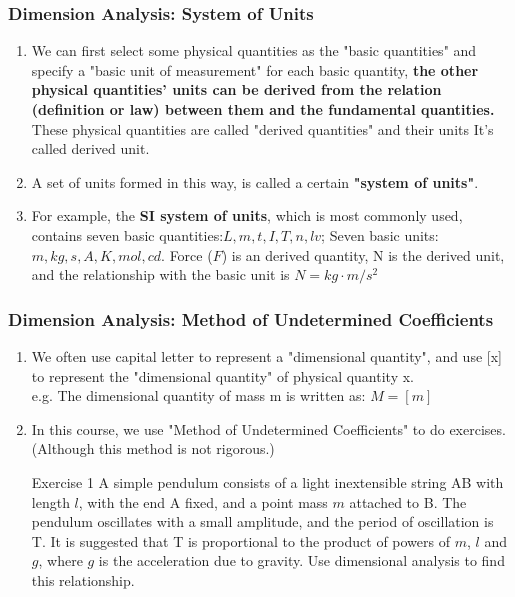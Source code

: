 \documentclass{beamer}
\begin{document}
\begin{frame}
    \frametitle{Dimension Analysis: System of Units}
    \begin{enumerate}
        \item We can first select some physical quantities as the "basic quantities" and specify a "basic unit of measurement" for each basic quantity, \textbf{the other physical quantities’ units can be derived from the relation (definition or law) between them and the fundamental quantities.} These physical quantities are called "derived quantities" and their units
        It's called derived unit.
        \item A set of units formed in this way, is called a certain \textbf{"system of units"}.\\
        \item  For example, the \textbf{SI system of units}, which is most commonly used, contains seven basic quantities:$L, m, t, I, T, n, lv$; Seven basic units:$m, kg, s, A, K, mol, cd$. Force ($F$) is an derived quantity, N is the derived unit, and the relationship with the basic unit is $N=kg \cdot m / s^{2}$
    
    \end{enumerate}
\end{frame}
\begin{frame}
    \frametitle{Dimension Analysis: Method of Undetermined Coefficients}
    \begin{enumerate}

        \item We often use capital letter to represent a "dimensional quantity", and use [x] to represent 
        the "dimensional quantity" of physical quantity x. \\ 
        e.g.  The dimensional quantity of mass m is written as: $M=[m]$\\ 
        \item In this course, we use "Method of Undetermined Coefficients" to do exercises. (Although this method is not rigorous.)
            \begin{block}{Exercise 1}
                A simple pendulum consists of a light inextensible string AB with length $l$, with the end A fixed, 
                and a point mass $m$ attached to B. The pendulum oscillates with a small amplitude, and the period
                of oscillation is T. It is suggested that T is proportional to the product of powers of $m$, $l$ and $g$,
                where $g$ is the acceleration due to gravity. Use dimensional analysis to find this relationship.
            \end{block}
    \end{enumerate}
\end{frame}
\end{document}
